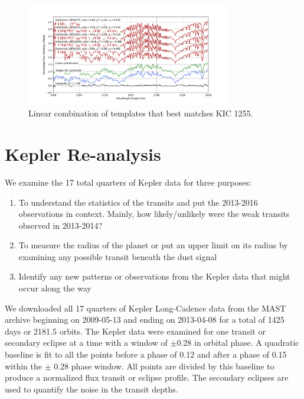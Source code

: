 \documentclass[preprint]{aastex61}
\begin{document}
\begin{figure}[!hbtp]
\begin{centering}
\includegraphics[width=0.8\textwidth]{images/subaru/lincomb_kic1255.pdf}
\caption{Linear combination of templates that best matches KIC 1255.}\label{fig:specMatchComb}
\end{centering}
\end{figure}



\clearpage

\section{Kepler Re-analysis}
We examine the 17 total quarters of Kepler data for three purposes:
\begin{enumerate}
	\item To understand the statistics of the transits and put the 2013-2016 observations in context. Mainly, how likely/unlikely were the weak transits observed in 2013-2014?
	\item To measure the radius of the planet or put an upper limit on its radius by examining any possible transit beneath the dust signal
	\item Identify any new patterns or observations from the Kepler data that might occur along the way
\end{enumerate}

We downloaded all 17 quarters of Kepler Long-Cadence data from the MAST archive beginning on 2009-05-13 and ending on 2013-04-08 for a total of 1425 days or 2181.5 orbits.
The Kepler data were examined for one transit or secondary eclipse at a time with a window of $\pm$0.28 in orbital phase.
A quadratic baseline is fit to all the points before a phase of 0.12 and after a phase of 0.15 within the $\pm$ 0.28 phase window.
All points are divided by this baseline to produce a normalized flux transit or eclipse profile.
The secondary eclipses are used to quantify the noise in the transit depths.
\end{document}
